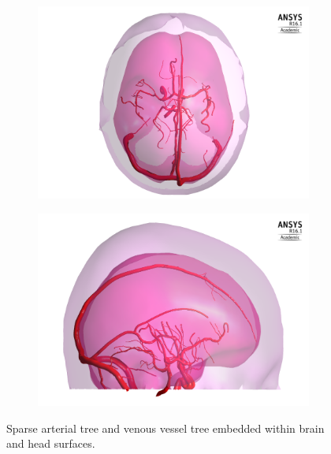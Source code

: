 \documentclass[11pt,english,a4paper,twoside,openright]{report}
\begin{document}
{{{{{{{{\begin{figure}[h]
	\centering	
	\begin{subfigure}[b]{0.45\textwidth}
		\includegraphics[width=\textwidth]{3DFullVessels/FirstModelTransparency2}
	\end{subfigure}
	\begin{subfigure}[b]{0.45\textwidth}
		\includegraphics[width=\textwidth]{3DFullVessels/FirstModelTransparency1}
	\end{subfigure}
	\caption[Sparse arterial tree and venous vessel tree embedded within brain and head surfaces]{Sparse arterial tree and venous vessel tree embedded within brain and head surfaces.}
	\label{fig:3DTransparencies1}
\end{figure}

}}}}}}}}
\end{document}
